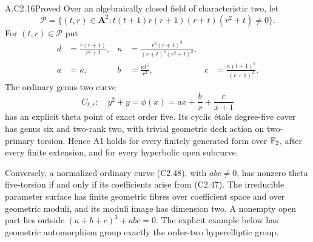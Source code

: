 \begin{claim}{A.C2.16}{Proved}
Over an algebraically closed field of characteristic two, let
\[
 \mathscr P=\{(t,r)\in\mathbf A^2:
          t(t+1)r(r+1)(r+t)(r^2+t)\ne0\}.
\]
For $(t,r)\in\mathscr P$ put
\[
 \begin{aligned}
 d&=\frac{r(r+1)}{r^2+t},&
 \kappa&=\frac{r^3(r+1)^3}{(r+t)^3(r^2+t)^2},\\
 a&=\kappa,&b&=\frac{\kappa t^5}{r^2},&
 c&=\frac{\kappa(t+1)^5}{(r+1)^2}.
 \end{aligned}                                                   \tag{C2.47}
\]
The ordinary genus-two curve
\[
               C_{t,r}:\quad y^2+y=\phi(x)
                     =ax+\frac b x+\frac c{x+1}                 \tag{C2.48}
\]
has an explicit theta point of exact order five.
Its cyclic \'etale degree-five cover has genus six and
two-rank two, with trivial geometric deck action on
two-primary torsion. Hence A1 holds for every finitely
generated form over $\mathbb F_2$, after every finite extension,
and for every hyperbolic open subcurve.

Conversely, a normalized ordinary curve (C2.48), with
$abc\ne0$, has nonzero theta five-torsion if and only if
its coefficients arise from (C2.47).
The irreducible parameter surface has finite geometric
fibres over coefficient space and over geometric moduli,
and its moduli image has dimension two. A nonempty open
part lies outside $(a+b+c)^3+abc=0$.
The explicit example below has geometric automorphism
group exactly the order-two hyperelliptic group.
\end{claim}
